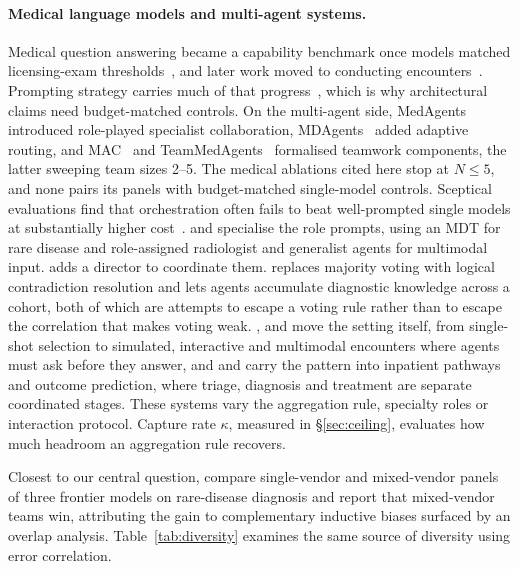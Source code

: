 \paragraph{Medical language models and multi-agent systems.}
Medical question answering became a capability benchmark once models matched licensing-exam
thresholds~\citep{kung2023usmle, nori2023capabilities, singhal2023medpalm, singhal2025medpalm2},
and later work moved to conducting encounters~\citep{tu2025amie, mcduff2025amie}. Prompting
strategy carries much of that progress~\citep{nori2024medprompt}, which is why architectural
claims need budget-matched controls. On the multi-agent side, MedAgents~\citep{tang2024medagents}
introduced role-played specialist collaboration, MDAgents~\citep{kim2024mdagents} added adaptive
routing, and MAC~\citep{chen2025mac} and TeamMedAgents~\citep{teammedagents} formalised teamwork
components, the latter sweeping team sizes 2--5. The medical ablations cited here stop at
$N \leq 5$, and none pairs its panels with budget-matched single-model controls.
Sceptical evaluations find that orchestration often fails to beat well-prompted single models at
substantially higher cost~\citep{medagentboard, npjdm2026, confagents}.
\citet{chen2024rareagents} and \citet{zhou2025mam} specialise the role prompts, using an MDT for
rare disease and role-assigned radiologist and generalist agents for multimodal input.
\citet{liu2025medchat} adds a director to coordinate them.
\citet{ma2025medla} replaces majority voting with logical contradiction resolution and
\citet{li2025macd} lets agents accumulate diagnostic knowledge across a cohort, both of which are
attempts to escape a voting rule rather than to escape the correlation that makes voting weak.
\citet{fan2024aihospital}, \citet{sanghvi2026medxagent} and \citet{sviridov2025threemdbench}
move the setting itself, from single-shot selection to simulated, interactive and multimodal
encounters where agents must ask before they answer, and \citet{chen2026map} and
\citet{shi2026phoagents} carry the pattern into inpatient pathways and outcome prediction, where
triage, diagnosis and treatment are separate coordinated stages. These systems vary the
aggregation rule, specialty roles or interaction protocol. Capture rate $\kappa$, measured in
\S\ref{sec:ceiling}, evaluates how much headroom an aggregation rule recovers.

Closest to our central question, \citet{yuan2026mixedvendor} compare single-vendor and
mixed-vendor panels of three frontier models on rare-disease diagnosis and report that mixed-vendor
teams win, attributing the gain to complementary inductive biases surfaced by an overlap analysis.
Table~\ref{tab:diversity} examines the same source of diversity using error correlation.

